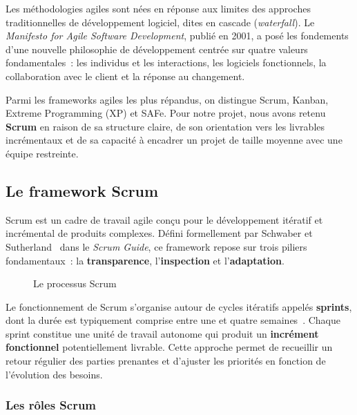 Les méthodologies agiles sont nées en réponse aux limites des approches traditionnelles de développement logiciel, dites \og en cascade \fg{} (\textit{waterfall}). Le \textit{Manifesto for Agile Software Development}, publié en 2001, a posé les fondements d'une nouvelle philosophie de développement centrée sur quatre valeurs fondamentales~: les individus et les interactions, les logiciels fonctionnels, la collaboration avec le client et la réponse au changement.

Parmi les frameworks agiles les plus répandus, on distingue Scrum, Kanban, Extreme Programming (XP) et SAFe. Pour notre projet, nous avons retenu \textbf{Scrum} en raison de sa structure claire, de son orientation vers les livrables incrémentaux et de sa capacité à encadrer un projet de taille moyenne avec une équipe restreinte.

\subsection{Le framework Scrum}

Scrum est un cadre de travail agile conçu pour le développement itératif et incrémental de produits complexes. Défini formellement par Schwaber et Sutherland~\cite{schwaber2020} dans le \textit{Scrum Guide}, ce framework repose sur trois piliers fondamentaux~: la \textbf{transparence}, l'\textbf{inspection} et l'\textbf{adaptation}.

\begin{figure}[H]
    \centering
    \caption{Le processus Scrum~\cite{schwaber2020}}
    \label{fig:scrum_process}
\end{figure}

Le fonctionnement de Scrum s'organise autour de cycles itératifs appelés \textbf{sprints}, dont la durée est typiquement comprise entre une et quatre semaines~\cite{rubin2012}. Chaque sprint constitue une unité de travail autonome qui produit un \textbf{incrément fonctionnel} potentiellement livrable. Cette approche permet de recueillir un retour régulier des parties prenantes et d'ajuster les priorités en fonction de l'évolution des besoins.

\subsubsection{Les rôles Scrum}

